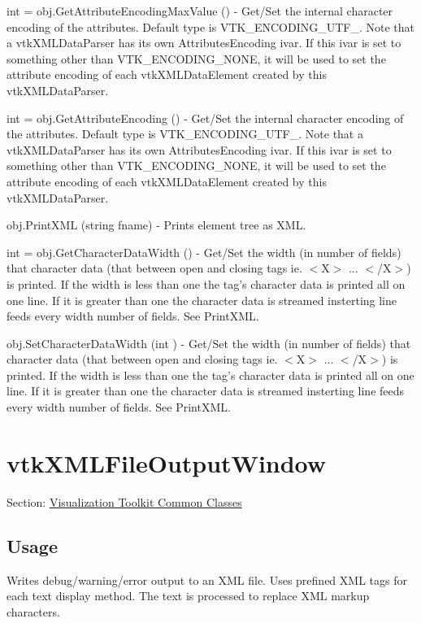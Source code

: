 \begin{DoxyItemize}
\item {\ttfamily int = obj.\-Get\-Attribute\-Encoding\-Max\-Value ()} -\/ Get/\-Set the internal character encoding of the attributes. Default type is V\-T\-K\-\_\-\-E\-N\-C\-O\-D\-I\-N\-G\-\_\-\-U\-T\-F\-\_. Note that a vtk\-X\-M\-L\-Data\-Parser has its own Attributes\-Encoding ivar. If this ivar is set to something other than V\-T\-K\-\_\-\-E\-N\-C\-O\-D\-I\-N\-G\-\_\-\-N\-O\-N\-E, it will be used to set the attribute encoding of each vtk\-X\-M\-L\-Data\-Element created by this vtk\-X\-M\-L\-Data\-Parser.  
\item {\ttfamily int = obj.\-Get\-Attribute\-Encoding ()} -\/ Get/\-Set the internal character encoding of the attributes. Default type is V\-T\-K\-\_\-\-E\-N\-C\-O\-D\-I\-N\-G\-\_\-\-U\-T\-F\-\_. Note that a vtk\-X\-M\-L\-Data\-Parser has its own Attributes\-Encoding ivar. If this ivar is set to something other than V\-T\-K\-\_\-\-E\-N\-C\-O\-D\-I\-N\-G\-\_\-\-N\-O\-N\-E, it will be used to set the attribute encoding of each vtk\-X\-M\-L\-Data\-Element created by this vtk\-X\-M\-L\-Data\-Parser.  
\item {\ttfamily obj.\-Print\-X\-M\-L (string fname)} -\/ Prints element tree as X\-M\-L.  
\item {\ttfamily int = obj.\-Get\-Character\-Data\-Width ()} -\/ Get/\-Set the width (in number of fields) that character data (that between open and closing tags ie. $<$\-X$>$ ... $<$/\-X$>$) is printed. If the width is less than one the tag's character data is printed all on one line. If it is greater than one the character data is streamed insterting line feeds every width number of fields. See Print\-X\-M\-L.  
\item {\ttfamily obj.\-Set\-Character\-Data\-Width (int )} -\/ Get/\-Set the width (in number of fields) that character data (that between open and closing tags ie. $<$\-X$>$ ... $<$/\-X$>$) is printed. If the width is less than one the tag's character data is printed all on one line. If it is greater than one the character data is streamed insterting line feeds every width number of fields. See Print\-X\-M\-L.  
\end{DoxyItemize}\hypertarget{vtkcommon_vtkxmlfileoutputwindow}{}\section{vtk\-X\-M\-L\-File\-Output\-Window}\label{vtkcommon_vtkxmlfileoutputwindow}
Section\-: \hyperlink{sec_vtkcommon}{Visualization Toolkit Common Classes} \hypertarget{vtkwidgets_vtkxyplotwidget_Usage}{}\subsection{Usage}\label{vtkwidgets_vtkxyplotwidget_Usage}
Writes debug/warning/error output to an X\-M\-L file. Uses prefined X\-M\-L tags for each text display method. The text is processed to replace X\-M\-L markup characters.

